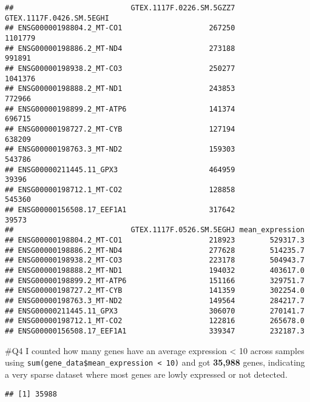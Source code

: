 \documentclass[
]{article}
\newenvironment{Shaded}{\begin{snugshade}}{\end{snugshade}}
\newcommand{\CommentTok}[1]{\textcolor[rgb]{0.56,0.35,0.01}{\textit{#1}}}
\newcommand{\DecValTok}[1]{\textcolor[rgb]{0.00,0.00,0.81}{#1}}
\newcommand{\FunctionTok}[1]{\textcolor[rgb]{0.13,0.29,0.53}{\textbf{#1}}}
\newcommand{\NormalTok}[1]{#1}
\newcommand{\SpecialCharTok}[1]{\textcolor[rgb]{0.81,0.36,0.00}{\textbf{#1}}}
\begin{document}
\begin{verbatim}
##                           GTEX.1117F.0226.SM.5GZZ7 GTEX.1117F.0426.SM.5EGHI
## ENSG00000198804.2_MT-CO1                    267250                  1101779
## ENSG00000198886.2_MT-ND4                    273188                   991891
## ENSG00000198938.2_MT-CO3                    250277                  1041376
## ENSG00000198888.2_MT-ND1                    243853                   772966
## ENSG00000198899.2_MT-ATP6                   141374                   696715
## ENSG00000198727.2_MT-CYB                    127194                   638209
## ENSG00000198763.3_MT-ND2                    159303                   543786
## ENSG00000211445.11_GPX3                     464959                    39396
## ENSG00000198712.1_MT-CO2                    128858                   545360
## ENSG00000156508.17_EEF1A1                   317642                    39573
##                           GTEX.1117F.0526.SM.5EGHJ mean_expression
## ENSG00000198804.2_MT-CO1                    218923        529317.3
## ENSG00000198886.2_MT-ND4                    277628        514235.7
## ENSG00000198938.2_MT-CO3                    223178        504943.7
## ENSG00000198888.2_MT-ND1                    194032        403617.0
## ENSG00000198899.2_MT-ATP6                   151166        329751.7
## ENSG00000198727.2_MT-CYB                    141359        302254.0
## ENSG00000198763.3_MT-ND2                    149564        284217.7
## ENSG00000211445.11_GPX3                     306070        270141.7
## ENSG00000198712.1_MT-CO2                    122816        265678.0
## ENSG00000156508.17_EEF1A1                   339347        232187.3
\end{verbatim}

\#Q4 I counted how many genes have an average expression \textless{} 10
across samples using
\texttt{sum(gene\_data\$mean\_expression\ \textless{}\ 10)} and got
\textbf{35,988} genes, indicating a very sparse dataset where most genes
are lowly expressed or not detected.

\begin{Shaded}
\end{Shaded}

\begin{verbatim}
## [1] 35988
\end{verbatim}
\end{document}
